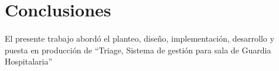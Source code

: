 \section{Conclusiones}

\paragraph{}
El presente trabajo abordó el planteo, diseño, implementación, desarrollo y puesta en producción de ``Triage, Sistema de gestión para 
sala de Guardia Hospitalaria''

